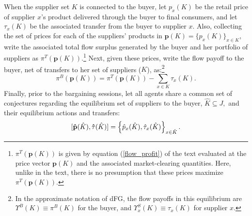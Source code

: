 \documentclass[12pt]{article} \usepackage{amsmath,amssymb,amsthm,geometry,graphicx,setspace,algorithm,algpseudocode,float}
\begin{document}
When the supplier set $K$ is connected to the buyer, let $p_{x}(K)$ be the retail price of supplier $x$'s product delivered through the buyer to final consumers, and let $\tau_{x}(K)$ be the associated transfer from the buyer to supplier $x.$ Also, collecting the set of prices for each of the suppliers' products in $\mathbf{p}(K)=\{p_{x}(K)\}_{x\in K}$, write the associated total flow surplus generated by the buyer and her portfolio of suppliers as $\pi^{T}(\mathbf{p}(K))$.\footnote{$\pi^{T}(\mathbf{p}(K))$ is given by equation (\ref{flow_profit}) of the text evaluated at the price vector $\mathbf{p}(K)$ and the associated market-clearing quantities. Here, unlike in the text, there is no presumption that these prices maximize $\pi^{T}(\mathbf{p}(K))$.\medskip} Next, given these prices, write the flow payoff to the buyer, net of transfers to her set of suppliers ($K$), as:\footnote{%
In the approximate notation of dFG, the flow payoffs in this equilibrium are $ \Upsilon^B(K) \equiv \pi^{B}(K)$ for the buyer, and $\Upsilon^S_{x}(K) \equiv  \tau_{x}(K) $ for supplier $x$.}%
\begin{equation}
\pi ^{B}(\mathbf{p}(K))=\pi ^{T}(\mathbf{p}(K))-\sum_{x\in K}\tau%
_{x}(K).  \label{buyer_surplus}
\end{equation}
Finally, prior to the bargaining sessions, let all agents share a common set of conjectures regarding the equilibrium set of suppliers to the buyer, $%
\hat{K}\subseteq J,$ and their equilibrium actions and transfers:%
\begin{equation*}
\lbrack \mathbf{\hat{p}}(\hat{K}),\mathbf{\hat{\tau}}(\hat{K})]=\left\{ \hat{%
p}_{x}(\hat{K}),\hat{\tau}_{x}(\hat{K})\right\} _{x\in \hat{K}}.
\end{equation*}
\end{document}
